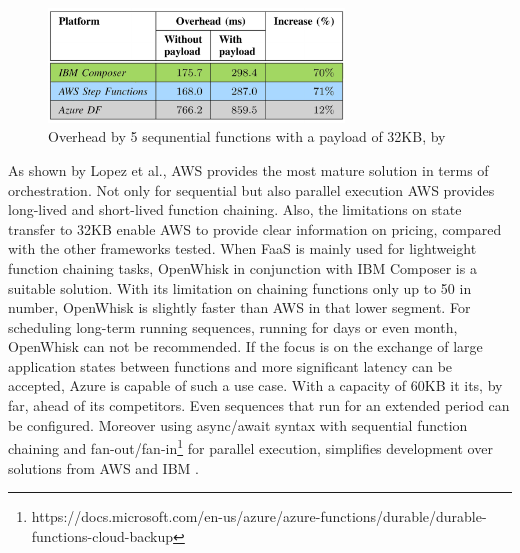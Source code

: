 \documentclass[a4paper,11pt, pagesize]{scrartcl}
\begin{document}
\begin{spacing}{1.2}
\begin{figure}[H]
\includegraphics[width=0.7\textwidth]{Orchestration}
\caption{Overhead by 5 sequnential functions with a payload of 32KB, by \cite{lopez2018comparison}}
\end{figure} 
As shown by Lopez et al., AWS provides the most mature solution in terms of orchestration. Not only for sequential but also parallel execution AWS provides long-lived and short-lived function chaining. Also, the limitations on state transfer to 32KB enable AWS to provide clear information on pricing, compared with the other frameworks tested. When FaaS is mainly used for lightweight function chaining tasks, OpenWhisk in conjunction with IBM Composer is a suitable solution. With its limitation on chaining functions only up to 50 in number, OpenWhisk is slightly faster than AWS in that lower segment. For scheduling long-term running sequences, running for days or even month, OpenWhisk can not be recommended. If the focus is on the exchange of large application states between functions and more significant latency can be accepted, Azure is capable of such a use case. With a capacity of 60KB it its, by far, ahead of its competitors. Even sequences that run for an extended period can be configured. Moreover using async/await syntax with sequential function chaining and fan-out/fan-in\footnote{https://docs.microsoft.com/en-us/azure/azure-functions/durable/durable-functions-cloud-backup} for parallel execution, simplifies development over solutions from AWS and IBM \cite{lopez2018comparison}.

\end{spacing}
\end{document}
